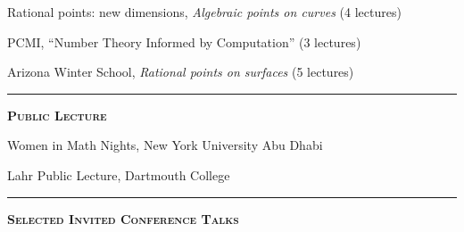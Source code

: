 \documentclass[12pt]{article}
\newcommand{\sectionheading}[1]
	{\bigskip %
	\noindent
	\hspace{-6.5mm}\textcolor{Gray}{\rule[.75mm]{21.5mm}{1mm}} %
	\hspace{.2mm}	%
	{\large{\textbf{\textsc{#1}}}} %
}
\newenvironment{date_section}
	{
	\vspace{-1ex}
	\leftmargini = 15ex
	 \begin{itemize}[
		 labelsep = *,
		 labelwidth = 9ex,
		 labelindent = 0ex,
		 itemindent = !,
		 font=\normalfont, 
		 align=parleft
		 ]
		{}
		\itemsep=-1.5mm}
	{\end{itemize}\vspace{-2ex}}
\newcommand{\yearmo}[2]{
	\item[ 
		{\makebox[1ex][r]{#1}}
		\hspace{1ex}
		{\makebox[1ex][l]{#2} }
		] }
\begin{document}
		\begin{date_section}

			\yearmo{}{2024}
			Rational points: new dimensions, \textit{Algebraic points on curves} (4 lectures) 

			\yearmo{}{2022}
			PCMI, ``Number Theory 
			Informed by Computation'' (3 lectures) 


			\yearmo{}{2015}
			Arizona Winter School, {\it Rational points on surfaces} (5 lectures)
		\end{date_section}

	\sectionheading{Public Lecture}%

		\begin{date_section}
			\yearmo{}{2024}
			Women in Math Nights, New York
			University Abu Dhabi

			\yearmo{}{2022}
			Lahr Public Lecture, Dartmouth College
		\end{date_section}


	\sectionheading{Selected Invited Conference Talks}%
	
\end{document}
